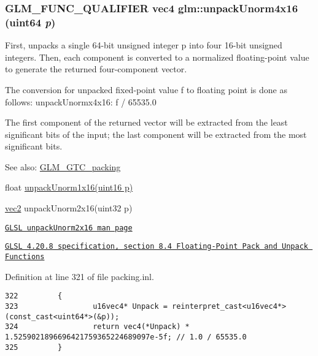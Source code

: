 \hypertarget{group__gtc__packing_gfb2b502bc406031a5618ce930139a9e3}{
\subsubsection[unpackUnorm4x16]{\setlength{\rightskip}{0pt plus 5cm}GLM\_\-FUNC\_\-QUALIFIER vec4 glm::unpackUnorm4x16 (uint64 {\em p})}}
\label{group__gtc__packing_gfb2b502bc406031a5618ce930139a9e3}


First, unpacks a single 64-bit unsigned integer p into four 16-bit unsigned integers. Then, each component is converted to a normalized floating-point value to generate the returned four-component vector.

The conversion for unpacked fixed-point value f to floating point is done as follows: unpackUnormx4x16: f / 65535.0

The first component of the returned vector will be extracted from the least significant bits of the input; the last component will be extracted from the most significant bits.

\begin{Desc}
\item[See also:]\hyperlink{group__gtc__packing}{GLM\_\-GTC\_\-packing} 

float \hyperlink{group__gtc__packing_g7770e3ade4f4764cc1b2eb42ac4ec188}{unpackUnorm1x16(uint16 p)} 

\hyperlink{group__core__types_ga1618f51db67eaa145db101d8c8431d8}{vec2} unpackUnorm2x16(uint32 p) 

\href{http://www.opengl.org/sdk/docs/manglsl/xhtml/unpackUnorm2x16.xml}{\tt GLSL unpackUnorm2x16 man page} 

\href{http://www.opengl.org/registry/doc/GLSLangSpec.4.20.8.pdf}{\tt GLSL 4.20.8 specification, section 8.4 Floating-Point Pack and Unpack Functions} \end{Desc}


Definition at line 321 of file packing.inl.

\begin{Code}\begin{verbatim}322         {
323                 u16vec4* Unpack = reinterpret_cast<u16vec4*>(const_cast<uint64*>(&p));
324                 return vec4(*Unpack) * 1.5259021896696421759365224689097e-5f; // 1.0 / 65535.0
325         }
\end{verbatim}
\end{Code}


